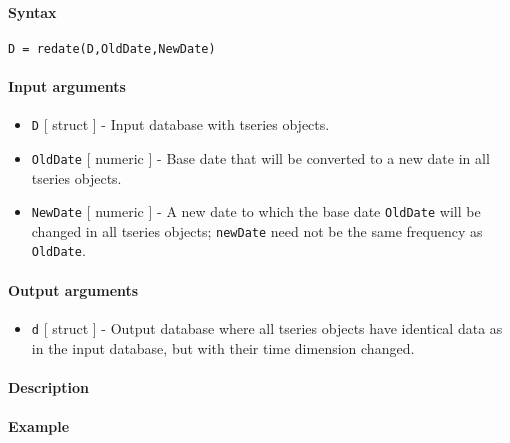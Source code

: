 


	\paragraph{Syntax}

\begin{verbatim}
D = redate(D,OldDate,NewDate)
\end{verbatim}

\paragraph{Input arguments}

\begin{itemize}
\item
  \texttt{D} {[} struct {]} - Input database with tseries objects.
\item
  \texttt{OldDate} {[} numeric {]} - Base date that will be converted to
  a new date in all tseries objects.
\item
  \texttt{NewDate} {[} numeric {]} - A new date to which the base date
  \texttt{OldDate} will be changed in all tseries objects;
  \texttt{newDate} need not be the same frequency as \texttt{OldDate}.
\end{itemize}

\paragraph{Output arguments}

\begin{itemize}
\itemsep1pt\parskip0pt
\item
  \texttt{d} {[} struct {]} - Output database where all tseries objects
  have identical data as in the input database, but with their time
  dimension changed.
\end{itemize}

\paragraph{Description}

\paragraph{Example}


